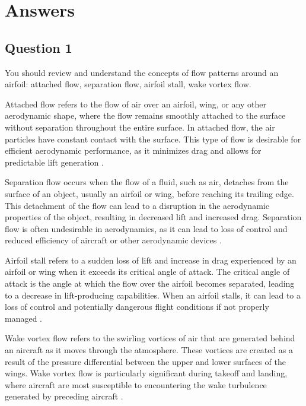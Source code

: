 \chapter{Answers}
\label{cp:answers}
\section{Question 1}
\begin{importantbox}
    You should review and understand the concepts of flow patterns around an airfoil: attached flow, separation flow, airfoil stall, wake vortex flow.
\end{importantbox}

Attached flow refers to the flow of air over an airfoil, wing, or any other aerodynamic shape, where the flow remains smoothly attached to the surface without separation throughout the entire surface. In attached flow, the air particles have constant contact with the surface. This type of flow is desirable for efficient aerodynamic performance, as it minimizes drag and allows for predictable lift generation \citep{Anderson_2016}.

Separation flow occurs when the flow of a fluid, such as air, detaches from the surface of an object, usually an airfoil or wing, before reaching its trailing edge. This detachment of the flow can lead to a disruption in the aerodynamic properties of the object, resulting in decreased lift and increased drag. Separation flow is often undesirable in aerodynamics, as it can lead to loss of control and reduced efficiency of aircraft or other aerodynamic devices \citep{Anderson_2016}.

Airfoil stall refers to a sudden loss of lift and increase in drag experienced by an airfoil or wing when it exceeds its critical angle of attack. The critical angle of attack is the angle at which the flow over the airfoil becomes separated, leading to a decrease in lift-producing capabilities. When an airfoil stalls, it can lead to a loss of control and potentially dangerous flight conditions if not properly managed \citep{Anderson_2016}.

Wake vortex flow refers to the swirling vortices of air that are generated behind an aircraft as it moves through the atmosphere. These vortices are created as a result of the pressure differential between the upper and lower surfaces of the wings. Wake vortex flow is particularly significant during takeoff and landing, where aircraft are most susceptible to encountering the wake turbulence generated by preceding aircraft \citep{Anderson_2016}.

